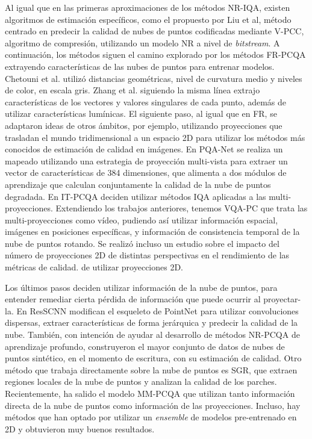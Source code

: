 Al igual que en las primeras aproximaciones de los métodos NR-IQA, existen 
algoritmos de estimación específicos, como el propuesto por Liu et al\cite{bitstreamPCQ},
método centrado en predecir la calidad de nubes de puntos 
codificadas mediante V-PCC, algoritmo de compresión, utilizando un modelo NR 
a nivel de \emph{bitstream}. A continuación, los métodos siguen el camino explorado 
por los métodos FR-PCQA extrayendo características de las nubes de puntos para 
entrenar modelos.  Chetouni et al.\cite{NR-CNN-3D-PC} utilizó distancias geométricas, nivel de curvatura medio
y niveles de color, en escala gris. Zhang et al.\cite{NR3DQA} siguiendo la misma 
línea extrajo características de los vectores y valores singulares de cada punto,
además de utilizar características lumínicas.
El siguiente paso, al igual que en FR, se adaptaron ideas de otros ámbitos, por ejemplo, utilizando 
proyecciones que trasladan el mundo tridimensional a un espacio 2D para utilizar 
los métodos más conocidos de estimación de calidad en imágenes.
En PQA-Net\cite{PQA-Net} se realiza un mapeado 
utilizando una estrategia de proyección multi-vista para extraer un vector de 
características de 384 dimensiones, que alimenta a dos módulos de aprendizaje 
que calculan conjuntamente la calidad de la nube de puntos degradada. 
En IT-PCQA\cite{IT-PCQA} deciden utilizar métodos IQA aplicadas a las multi-proyecciones.
Extendiendo los trabajos anteriores, tenemos VQA-PC\cite{VQA-PC} que trata las 
multi-proyecciones como vídeo, pudiendo así utilizar información espacial, 
imágenes en posiciones específicas, y información de consistencia temporal 
de la nube de puntos rotando. 
Se realizó incluso un estudio sobre el impacto del número de proyecciones 2D de 
distintas perspectivas en el rendimiento de las métricas de calidad\cite{ImpactOf2DProyections, IT-PCQA}.
de utilizar proyecciones 2D.

Los últimos pasos deciden utilizar información de la nube de puntos, para 
entender remediar cierta pérdida de información que puede ocurrir al proyectar-la. 
En ResSCNN\cite{ResSCNN} modifican el esqueleto de PointNet\cite{PointNet} para 
utilizar convoluciones dispersas, extraer características de forma jerárquica y 
predecir la calidad de la nube. También, con intención de ayudar al desarrollo 
de métodos NR-PCQA de aprendizaje profundo, construyeron el mayor conjunto de datos
de nubes de puntos sintético, en el momento de escritura, con su estimación de calidad. 
Otro método que trabaja directamente sobre la nube de puntos es SGR\cite{SGR}, 
que extraen regiones locales de la nube de puntos y analizan la calidad de los parches.
Recientemente, ha salido el modelo MM-PCQA\cite{MM-PCQA} que utilizan tanto información 
directa de la nube de puntos como información de las proyecciones. Incluso, hay 
métodos que han optado por utilizar un \emph{ensemble}\cite{EnsemblePCQA} de 
modelos pre-entrenado en 2D y obtuvieron muy buenos resultados. 


